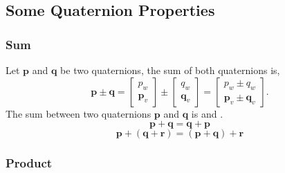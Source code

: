 \documentclass{article}
\renewcommand{\Vec}[1]{\mathbf{#1}}
\begin{document}
\subsection{Some Quaternion Properties}


\subsubsection{Sum}

Let $\Vec{p}$ and $\Vec{q}$ be two quaternions, the sum of both quaternions is,
%
\begin{equation}
  \Vec{p} \pm \Vec{q} =
  \begin{bmatrix} p_w \\ \Vec{p}_{v} \end{bmatrix}
  \pm
  \begin{bmatrix} q_w \\ \Vec{q}_{v} \end{bmatrix} =
  \begin{bmatrix} p_w \pm q_w \\ \Vec{p}_{v} \pm \Vec{q}_{v} \end{bmatrix}.
\end{equation}
%
The sum between two quaternions $\Vec{p}$ and $\Vec{q}$ is 
and .
%
\begin{equation}
  \Vec{p} + \Vec{q} = \Vec{q} + \Vec{p}
\end{equation}
%
\begin{equation}
  \Vec{p} + (\Vec{q} + \Vec{r}) = (\Vec{p} + \Vec{q}) + \Vec{r}
\end{equation}


\subsubsection{Product}
\end{document}

